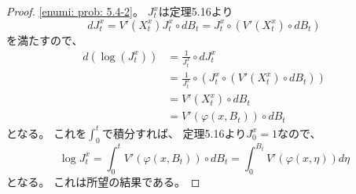 \documentclass[uplatex]{jsarticle}
\theoremstyle{definition}
\begin{document}
\begin{proof}
  \ref{enumi: prob: 5.4-2}。
  \(J_t^x\)は定理5.16より
  \[
  dJ_t^x = V'(X_t^x)J_t^x\circ dB_t
  = J_t^x\circ \left( V'(X_t^x)\circ dB_t\right)
  \]
  を満たすので、
  \begin{align*}
    d\left( \log(J_t^x)\right)
    &= \frac{1}{J_t^x}\circ dJ_t^x \\
    &= \frac{1}{J_t^x}\circ
    \left( J_t^x\circ \left( V'(X_t^x)\circ dB_t\right) \right) \\
    &= V'(X_t^x)\circ dB_t \\
    &= V'(\varphi(x,B_t))\circ dB_t
  \end{align*}
  となる。
  これを\(\int_0^t\)で積分すれば、
  定理5.16より\(J_0^x = 1\)なので、
  \[
  \log J_t^x = \int_0^t V'(\varphi(x,B_t))\circ dB_t
  = \int_0^{B_t} V'(\varphi(x,\eta)) d\eta
  \]
  となる。
  これは所望の結果である。
\end{proof}
\end{document}
